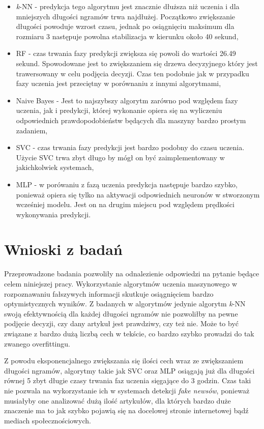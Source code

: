 \begin{itemize}
    \begin{itemize}
        \item \textit{k}-NN -
        predykcja tego algorytmu jest znacznie dłuższa niż uczenia i dla mniejszych długości ngramów trwa
        najdłużej. Początkowo zwiększanie długości powoduje wzrost czasu, jednak po osiągnięciu maksimum dla rozmiaru 3
        następuje powolna stabilizacja w kierunku około 40 sekund,
        \item RF -
        czas trwania fazy predykcji zwiększa się powoli do wartości 26.49 sekund. Spowodowane jest to zwiększaniem
        się drzewa decyzyjnego który jest trawersowany w celu podjęcia decyzji. Czas ten podobnie jak w przypadku 
        fazy uczenia jest przeciętny w porównaniu z innymi algorytmami,
        \item Naive Bayes -
        Jest to najszybszy algorytm zarówno pod względem fazy uczenia, jak i predykcji, której wykonanie 
        opiera się na wyliczeniu odpowiednich prawdopodobieństw będących dla maszyny bardzo prostym zadaniem,
        \item SVC -
        czas trwania fazy predykcji jest bardzo podobny do czasu uczenia. Użycie SVC trwa zbyt długo
        by mógł on być zaimplementowany w jakichkolwiek systemach,
        \item MLP -
        w porówaniu z fazą uczenia predykcja następuje bardzo szybko, ponieważ opiera się tylko
        na aktywacji odpowiednich neuronów w stworzonym wcześniej modelu. Jest on na drugim miejscu
        pod względem prędkości wykonywania predykcji.
    \end{itemize}
\end{itemize}




\section{Wnioski z badań}
Przeprowadzone badania pozwoliły na odnalezienie odpowiedzi na pytanie 
będące celem niniejszej pracy. Wykorzystanie algorytmów uczenia maszynowego 
w rozpoznawaniu fałszywych informacji skutkuje osiągnięciem bardzo optymistycznych wyników.
Z badanych w algorytmów jedynie algorytm \textit{k}-NN swoją efektywnością dla 
każdej długości ngramów nie pozwoliłby na pewne podjęcie decyzji, czy dany artykuł jest prawdziwy, czy też nie.
Może to być związane z bardzo dużą liczbą cech w tekście, co bardzo szybko prowadzi do tak zwanego 
overfittingu. 

Z powodu eksponencjalnego zwiększania się ilości cech wraz ze zwiększaniem długości ngramów, 
algorytmy takie jak SVC oraz MLP osiągają już dla długości równej 5 zbyt długie czasy trwania faz uczenia sięgające 
do 3 godzin. Czas taki nie pozwala na wykorzystanie ich w systemach detekcji \textit{fake newsów}, ponieważ
musiałyby one analizować dużą ilość artykułów, dla których bardzo duże znaczenie ma to jak 
szybko pojawią się na docelowej stronie internetowej bądź mediach społecznościowych.

